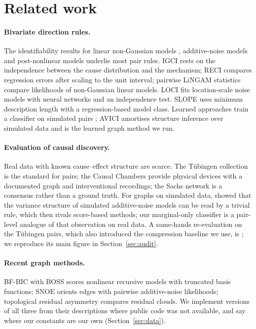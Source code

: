 \section{Related work}\label{sec:related}

\paragraph{Bivariate direction rules.} The identifiability results for linear non-Gaussian models \citep{shimizu2006linear}, additive-noise models \citep{hoyer2009nonlinear,peters2014identifiability,zhang2009identifiability} and post-nonlinear models underlie most pair rules. IGCI \citep{daniusis2010inferring} rests on the independence between the cause distribution and the mechanism; RECI \citep{blobaum2018cause} compares regression errors after scaling to the unit interval; pairwise LiNGAM statistics \citep{hyvarinen2013pairwise} compare likelihoods of non-Gaussian linear models. LOCI \citep{immer2023loci} fits location-scale noise models with neural networks and an independence test. SLOPE \citep{marx2017slope} uses minimum description length with a regression-based model class. Learned approaches train a classifier on simulated pairs \citep{lopezpaz2015towards}; AVICI \citep{lorch2022amortized} amortises structure inference over simulated data and is the learned graph method we run.

\paragraph{Evaluation of causal discovery.} Real data with known cause--effect structure are scarce. The T\"ubingen collection \citep{mooij2016distinguishing} is the standard for pairs; the Causal Chambers \citep{gamella2025chamber} provide physical devices with a documented graph and interventional recordings; the Sachs network \citep{sachs2005causal} is a consensus rather than a ground truth. For graphs on simulated data, \citet{reisach2021beware} showed that the variance structure of simulated additive-noise models can be read by a trivial rule, which then rivals score-based methods; our marginal-only classifier is a pair-level analogue of that observation on real data. A same-hands re-evaluation on the T\"ubingen pairs, which also introduced the compression baseline we use, is \citet{stienstra2026oneruler}; we reproduce its main figure in Section~\ref{sec:audit}.

\paragraph{Recent graph methods.} BF-BIC with BOSS \citep{ramsey2025bfbic} scores nonlinear recursive models with truncated basis functions; SNOE \citep{huang2025snoe} orients edges with pairwise additive-noise likelihoods; topological residual asymmetry \citep{elbouchattaoui2026tra} compares residual clouds. We implement versions of all three from their descriptions where public code was not available, and say where our constants are our own (Section~\ref{sec:data}).

